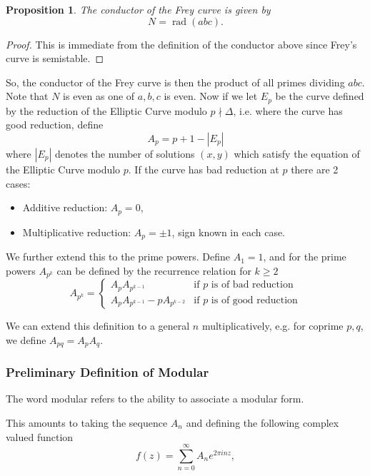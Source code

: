 \documentclass{article}
\newtheorem{prop}{Proposition}[section]
\theoremstyle{definition}
\theoremstyle{definition}
\theoremstyle{definition}
\newcommand{\rad}{\operatorname{rad}}
\begin{document}
\begin{prop} The conductor of the Frey curve is given by
$$N=\rad(abc).$$    
\end{prop}
\begin{proof}
 This is immediate from the definition of the conductor above since Frey's curve is semistable.   
\end{proof}
So, the conductor of the Frey curve is then the product of all primes dividing $abc$. Note that $N$ is even as one of $a,b,c$ is even. %
\newline \newline Now if we let $E_p$ be the curve defined by the reduction of the Elliptic Curve modulo $p\nmid\Delta$, i.e. where the curve has good reduction, define $$A_p=p+1-|E_p|$$ where $|E_p|$ denotes the number of solutions $(x,y)$ which satisfy the equation of the Elliptic Curve modulo $p$. If the curve has bad reduction at $p$ there are 2 cases:
\begin{itemize}
    \item Additive reduction: $A_p=0$,
    \item Multiplicative reduction: $A_p=\pm 1$, sign known in each case.
\end{itemize}
We further extend this to the prime powers. Define $A_1=1$, and for the prime powers $A_{p^k}$ can be defined by the recurrence relation for $k\geq2$
$$A_{p^k}=\begin{cases}
A_pA_{p^{k-1}}&\text{if $p$ is of bad reduction}\\
A_pA_{p^{k-1}}-pA_{p^{k-2}}&\text{if $p$ is of good reduction}
\end{cases}$$


We can extend this definition to a general $n$ multiplicatively, e.g. for coprime $p,q$, we define $A_{pq}=A_pA_q$.


\subsubsection{Preliminary Definition of Modular}

The word modular refers to the ability to associate a modular form.

This amounts to taking the sequence $A_n$ and defining the following complex valued function
$$f(z)=\sum_{n=0}^{\infty} A_n e^{2\pi i nz},$$
\end{document}
